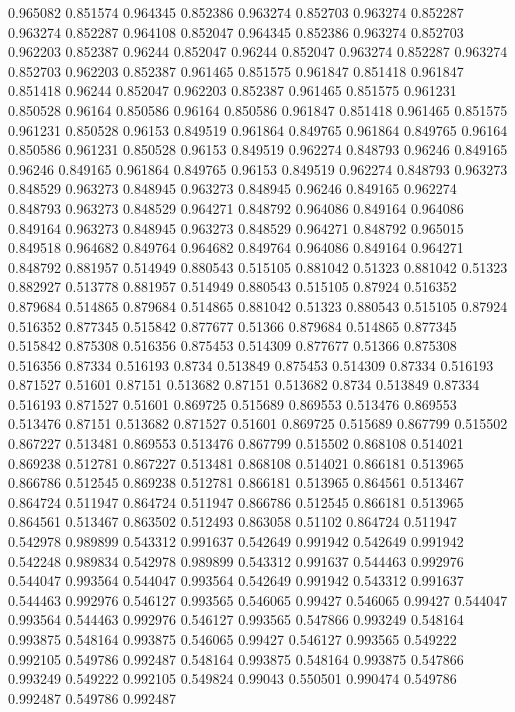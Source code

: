 0.965082 0.851574
0.964345 0.852386
0.963274 0.852703
0.963274 0.852287
0.963274 0.852287
0.964108 0.852047
0.964345 0.852386
0.963274 0.852703
0.962203 0.852387
0.96244 0.852047
0.96244 0.852047
0.963274 0.852287
0.963274 0.852703
0.962203 0.852387
0.961465 0.851575
0.961847 0.851418
0.961847 0.851418
0.96244 0.852047
0.962203 0.852387
0.961465 0.851575
0.961231 0.850528
0.96164 0.850586
0.96164 0.850586
0.961847 0.851418
0.961465 0.851575
0.961231 0.850528
0.96153 0.849519
0.961864 0.849765
0.961864 0.849765
0.96164 0.850586
0.961231 0.850528
0.96153 0.849519
0.962274 0.848793
0.96246 0.849165
0.96246 0.849165
0.961864 0.849765
0.96153 0.849519
0.962274 0.848793
0.963273 0.848529
0.963273 0.848945
0.963273 0.848945
0.96246 0.849165
0.962274 0.848793
0.963273 0.848529
0.964271 0.848792
0.964086 0.849164
0.964086 0.849164
0.963273 0.848945
0.963273 0.848529
0.964271 0.848792
0.965015 0.849518
0.964682 0.849764
0.964682 0.849764
0.964086 0.849164
0.964271 0.848792
0.881957 0.514949
0.880543 0.515105
0.881042 0.51323
0.881042 0.51323
0.882927 0.513778
0.881957 0.514949
0.880543 0.515105
0.87924 0.516352
0.879684 0.514865
0.879684 0.514865
0.881042 0.51323
0.880543 0.515105
0.87924 0.516352
0.877345 0.515842
0.877677 0.51366
0.879684 0.514865
0.877345 0.515842
0.875308 0.516356
0.875453 0.514309
0.877677 0.51366
0.875308 0.516356
0.87334 0.516193
0.8734 0.513849
0.875453 0.514309
0.87334 0.516193
0.871527 0.51601
0.87151 0.513682
0.87151 0.513682
0.8734 0.513849
0.87334 0.516193
0.871527 0.51601
0.869725 0.515689
0.869553 0.513476
0.869553 0.513476
0.87151 0.513682
0.871527 0.51601
0.869725 0.515689
0.867799 0.515502
0.867227 0.513481
0.869553 0.513476
0.867799 0.515502
0.868108 0.514021
0.869238 0.512781
0.867227 0.513481
0.868108 0.514021
0.866181 0.513965
0.866786 0.512545
0.869238 0.512781
0.866181 0.513965
0.864561 0.513467
0.864724 0.511947
0.864724 0.511947
0.866786 0.512545
0.866181 0.513965
0.864561 0.513467
0.863502 0.512493
0.863058 0.51102
0.864724 0.511947
0.542978 0.989899
0.543312 0.991637
0.542649 0.991942
0.542649 0.991942
0.542248 0.989834
0.542978 0.989899
0.543312 0.991637
0.544463 0.992976
0.544047 0.993564
0.544047 0.993564
0.542649 0.991942
0.543312 0.991637
0.544463 0.992976
0.546127 0.993565
0.546065 0.99427
0.546065 0.99427
0.544047 0.993564
0.544463 0.992976
0.546127 0.993565
0.547866 0.993249
0.548164 0.993875
0.548164 0.993875
0.546065 0.99427
0.546127 0.993565
0.549222 0.992105
0.549786 0.992487
0.548164 0.993875
0.548164 0.993875
0.547866 0.993249
0.549222 0.992105
0.549824 0.99043
0.550501 0.990474
0.549786 0.992487
0.549786 0.992487
